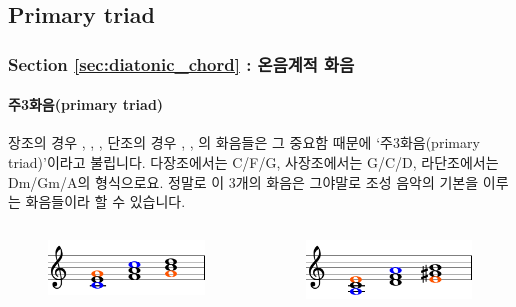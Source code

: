 \documentclass{beamer}
\newcommand{\Rn}[1]{%
	\textup{\uppercase\expandafter{\romannumeral#1}}%
}
\newcommand{\rn}[1]{%
	\textup{\lowercase\expandafter{\romannumeral#1}}%
}
\begin{document}
	\subsection{Primary triad}
	\begin{frame}
		\frametitle{Section \ref{sec:diatonic_chord} : 온음계적 화음}
		\framesubtitle{주3화음(primary triad)}
		장조의 경우 \Rn{1}, \Rn{4}, \Rn{5}, 단조의 경우 \rn{1}, \rn{4}, \Rn{5}의 화음들은 그 중요함 때문에 `주3화음(primary triad)'이라고 불립니다. 다장조에서는 C/F/G, 사장조에서는 G/C/D, 라단조에서는 Dm/Gm/A의 형식으로요. 정말로 이 3개의 화음은 그야말로 조성 음악의 기본을 이루는 화음들이라 할 수 있습니다.
		\begin{columns}
			\begin{column}{0.4\textwidth}
				\begin{figure}
					\centering
					\includegraphics[width=\columnwidth]{res/pdf/10/chord/primary_major_triad.pdf}
				\end{figure}
			\end{column}
			\begin{column}{0.4\textwidth}
				\begin{figure}
					\centering
					\includegraphics[width=\columnwidth]{res/pdf/10/chord/primary_minor_triad.pdf}
				\end{figure}
			\end{column}
		\end{columns}
		\begin{columns}
			\begin{column}{0.4\textwidth}
			\end{column}
			\begin{column}{0.4\textwidth}
				
			\end{column}
		\end{columns}
	\end{frame}
	
\end{document}

